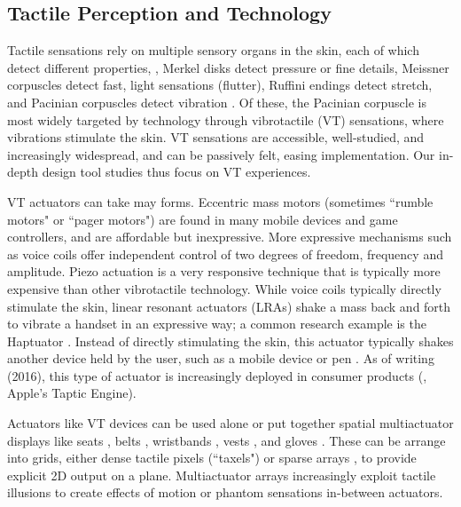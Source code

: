 \subsection{Tactile Perception and Technology}
Tactile sensations rely on multiple sensory organs in the skin, each of which detect different properties, \eg, Merkel disks detect pressure or fine details, Meissner corpuscles detect fast, light sensations (flutter), Ruffini endings detect stretch, and Pacinian corpuscles detect vibration \cite{ChoiKuchenbecker2013}.
Of these, the Pacinian corpuscle is most widely targeted by technology through vibrotactile (VT) sensations, where vibrations stimulate the skin.
VT sensations are accessible, well-studied, and increasingly widespread, and can be passively felt, easing implementation.
Our in-depth design tool studies thus focus on VT experiences.

VT actuators can take may forms.
Eccentric mass motors (sometimes ``rumble motors" or ``pager motors") are found in many mobile devices and game controllers, and are affordable but inexpressive.
More expressive mechanisms such as voice coils %
offer independent control of two degrees of freedom, frequency and amplitude.
Piezo actuation is a very responsive technique that is typically more expensive than other vibrotactile technology.
While voice coils typically directly stimulate the skin, linear resonant actuators (LRAs) shake a mass back and forth to vibrate a handset in an expressive way; a common research example is the Haptuator \cite{Yao2010}.
Instead of directly stimulating the skin, this actuator typically shakes another device held by the user, such as a mobile device \cite{Yoo2014} or pen \cite{Culbertson2014}.
As of writing (2016), this type of actuator is increasingly deployed in consumer products (\eg, Apple's Taptic Engine).

Actuators like VT devices can be used alone or put together spatial multiactuator displays like seats \cite{Israr2012,Israr2010}, belts \cite{Pielot2009,Paneels2013}, wristbands \cite{Arab2015,Paneels2013,Gupta2016}, vests \cite{Prasad2014,Jones2004}, and gloves \cite{Park2016,Kim2009}.
These can be arrange into grids, either dense tactile pixels (``taxels") \cite{Kim2009} or sparse arrays \cite{Israr2012,Israr2010}, to provide explicit 2D output on a plane.
Multiactuator arrays increasingly exploit tactile illusions to create effects of motion or phantom sensations in-between actuators.

